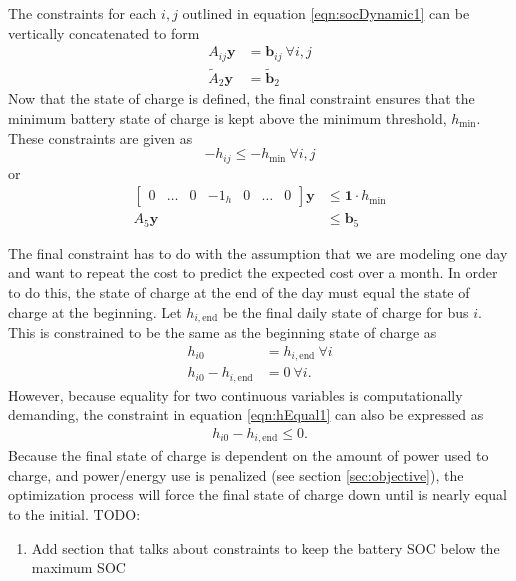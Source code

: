 The constraints for each $i,j$ outlined in equation \ref{eqn:socDynamic1} can be vertically concatenated to form
\begin{equation}\label{eqn:socDynamic3} \begin{aligned}
	A_{ij}\mathbf{y} &= \mathbf{b}_{ij} \ \forall i,j \\
	\tilde{A}_2\mathbf{y} &= \tilde{\mathbf{b}}_2
\end{aligned} \end{equation}
Now that the state of charge is defined, the final constraint ensures that the minimum battery state of charge is kept above the minimum threshold, $h_{\text{min}}$. These constraints are given as
\begin{equation}
	-h_{ij} \le -h_{\text{min}} \ \forall i,j
\end{equation}
or 
\begin{equation} \begin{aligned}
	\begin{bmatrix}0 & \hdots & 0 & -1_{h} & 0 & \hdots & 0\end{bmatrix} \mathbf{y} &\le \mathbf{1}\cdot h_{\text{min}}\\ 
		A_5\mathbf{y} &\le \mathbf{b}_5
\end{aligned} \end{equation}
\par The final constraint has to do with the assumption that we are modeling one day and want to repeat the cost to predict the expected cost over a month. In order to do this, the state of charge at the end of the day must equal the state of charge at the beginning. Let $h_{i,\text{end}}$ be the final daily state of charge for bus $i$. This is constrained to be the same as the beginning state of charge as
\begin{equation} \label{eqn:hEqual1} \begin{aligned}
	h_{i0} &= h_{i,\text{end}} \ \forall i \\
	h_{i0} - h_{i,\text{end}} &= 0 \ \forall i.  
\end{aligned} \end{equation}
However, because equality for two continuous variables is computationally demanding, the constraint in equation \ref{eqn:hEqual1} can also be expressed as 
\begin{equation} \begin{aligned}
	h_{i0} - h_{i,\text{end}} \le 0.
\end{aligned} \end{equation}
Because the final state of charge is dependent on the amount of power used to charge, and power/energy use is penalized (see section \ref{sec:objective}), the optimization process will force the final state of charge down until is nearly equal to the initial.
TODO:
\begin{enumerate}
	\item Add section that talks about constraints to keep the battery SOC below the maximum SOC
\end{enumerate}
